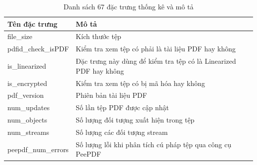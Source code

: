 \documentclass[./../main.tex]{subfiles}
\begin{document}
\begin{longtable}[c]{|p{}|p{}|}
	\caption{Danh sách 67 đặc trưng thống kê và mô tả}
	\label{tab:danh_sach_bang_67_dac_trung}                                                                                                                                 \\
	\hline
	\textbf{Tên đặc trưng}                    & \textbf{Mô tả}                                                                                                              \\ \hline
	\endfirsthead
	\endhead
	file\_size                                & Kích thước tệp                                                                                                              \\ \hline
	pdfid\_check\_isPDF                       & Kiểm tra xem tệp có phải là tài liệu PDF hay không                                                                          \\ \hline
	is\_linearized                            & Đặc trưng này dùng để kiểm tra tệp có là Linearized PDF hay không                                                           \\ \hline
	is\_encrypted                             & Kiểm tra xem tệp có bị mã hóa hay không                                                                                     \\ \hline
	pdf\_version                              & Phiên bản tài liệu PDF                                                                                                      \\ \hline
	num\_updates                              & Số lần tệp PDF được cập nhật                                                                                                \\ \hline
	num\_objects                              & Số lượng đối tượng xuất hiện trong tệp                                                                                      \\ \hline
	num\_streams                              & Số lượng các đối tượng stream                                                                                               \\ \hline
	peepdf\_num\_errors                       & Số lượng lỗi khi phân tích cú pháp tệp qua công cụ PeePDF                                                                   \\ \hline

\end{longtable}
\end{document}
